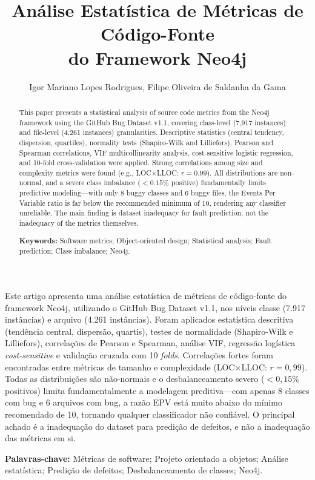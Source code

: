 \documentclass[12pt]{article}
\title{Análise Estatística de Métricas de Código-Fonte\\do Framework Neo4j}
\author{Igor Mariano Lopes Rodrigues\inst{1}, Filipe Oliveira de Saldanha da Gama\inst{1}}
\begin{document}
\maketitle

\begin{abstract}
This paper presents a statistical analysis of source code metrics from the Neo4j
framework using the GitHub Bug Dataset v1.1, covering class-level (7{,}917 instances)
and file-level (4{,}261 instances) granularities. Descriptive statistics (central
tendency, dispersion, quartiles), normality tests (Shapiro-Wilk and Lilliefors),
Pearson and Spearman correlations, VIF multicollinearity analysis, cost-sensitive
logistic regression, and 10-fold cross-validation were applied. Strong correlations
among size and complexity metrics were found (e.g., LOC$\times$LLOC: $r = 0.99$).
All distributions are non-normal, and a severe class imbalance ($<0.15\%$ positive)
fundamentally limits predictive modeling---with only 8 buggy classes and 6 buggy
files, the Events Per Variable ratio is far below the recommended minimum of 10,
rendering any classifier unreliable. The main finding is dataset inadequacy for fault
prediction, not the inadequacy of the metrics themselves.

\noindent\textbf{Keywords:} Software metrics; Object-oriented design; Statistical analysis; Fault prediction; Class imbalance; Neo4j.
\end{abstract}

\begin{resumo}
Este artigo apresenta uma análise estatística de métricas de código-fonte do
framework Neo4j, utilizando o GitHub Bug Dataset v1.1, nos níveis classe (7.917
instâncias) e arquivo (4.261 instâncias). Foram aplicados estatística descritiva
(tendência central, dispersão, quartis), testes de normalidade (Shapiro-Wilk e
Lilliefors), correlações de Pearson e Spearman, análise VIF, regressão logística
\textit{cost-sensitive} e validação cruzada com 10 \textit{folds}. Correlações
fortes foram encontradas entre métricas de tamanho e complexidade (LOC$\times$LLOC:
$r = 0{,}99$). Todas as distribuições são não-normais e o desbalanceamento severo
($<0{,}15\%$ positivos) limita fundamentalmente a modelagem preditiva---com apenas
8 classes com bug e 6 arquivos com bug, a razão EPV está muito abaixo do mínimo
recomendado de 10, tornando qualquer classificador não confiável. O principal
achado é a inadequação do dataset para predição de defeitos, e não a inadequação
das métricas em si.

\noindent\textbf{Palavras-chave:} Métricas de software; Projeto orientado a objetos; Análise estatística; Predição de defeitos; Desbalanceamento de classes; Neo4j.
\end{resumo}
\end{document}
